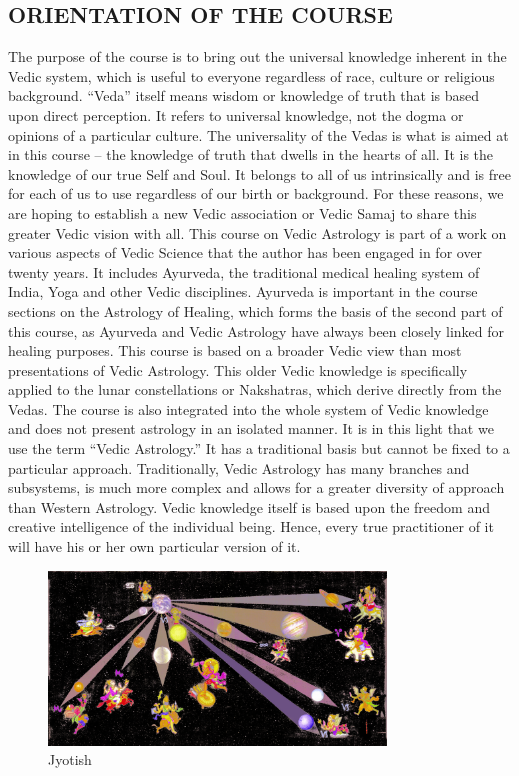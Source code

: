\subsection{ORIENTATION OF THE COURSE}
 The purpose of the course is to bring out the universal knowledge inherent in the Vedic system, which is useful to everyone regardless of race, culture or religious background. “Veda” itself means wisdom or knowledge of truth that is based upon direct perception. It refers to univers­al knowledge, not the dogma or opinions of a particular culture. The universality of the Vedas is what is aimed at in this course – the knowledge of truth that dwells in the hearts of all. It is the knowledge of our true Self and Soul. It belongs to all of us intrinsically and is free for each of us to use regardless of our birth or backgro­und. For these reasons, we are hoping to establish a new Vedic association or Vedic Samaj to share this greater Vedic vision with all.   This course on Vedic Astrology is part of a work on various aspects of Vedic Science that the author has been engaged in for over twenty years. It includes Ayurveda, the traditional medical healing system of India, Yoga and other Vedic disciplines. Ayurveda is important in the course sections on the Astrology of Healing, which forms the basis of the second part of this course, as Ayurveda and Vedic Astrology have always been closely linked for healing purposes.   This course is based on a broader Vedic view than most presentations of Vedic Astrology. This older Vedic knowledge is specifically applied to the lunar constellations or Nakshatras, which derive directly from the Vedas. The course is also integrated into the whole system of Vedic knowledge and does not present astrology in an isolated manner.   It is in this light that we use the term “Vedic Astrology.” It has a traditional basis but cannot be fixed to a particular approach. Traditionally, Vedic Astrology has many branches and subsystems, is much more complex and allows for a greater diversity of approach than Western Astrology. Vedic knowledge itself is based upon the freedom and creative intelli­gence of the individual being. Hence, every true practitioner of it will have his or her own particul­ar version of it.    
 
 \begin{figure}[H]
 \centering
\includegraphics[width=0.8\textwidth]{pics/intro1.png}
\caption{Jyotish}
 \end{figure}

